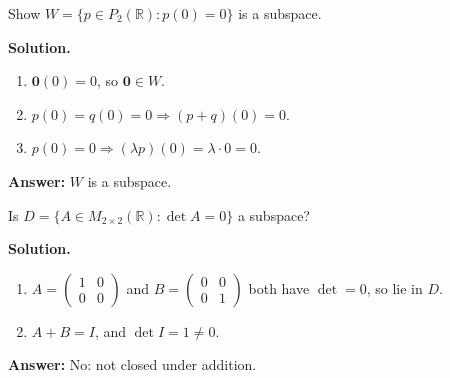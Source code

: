 \documentclass[11pt]{article}
\begin{document}
\begin{tcolorbox}[colback=white,colframe=ink!60,title={\bfseries Example 7 \textperiodcentered\ Subspace test}]Show $W=\{p\in P_{2}(\mathbb{R}):p(0)=0\}$ is a subspace.
\par\smallskip
\textbf{Solution.} \begin{enumerate}[leftmargin=1.6em,itemsep=1pt,topsep=2pt,label=\arabic*.]\item $\mathbf 0(0)=0$, so $\mathbf 0\in W$.
\item $p(0)=q(0)=0\Rightarrow(p+q)(0)=0$.
\item $p(0)=0\Rightarrow(\lambda p)(0)=\lambda\cdot0=0$.
\end{enumerate}\textbf{Answer:} $W$ is a subspace.
\end{tcolorbox}
\begin{tcolorbox}[colback=white,colframe=ink!60,title={\bfseries Example 8 \textperiodcentered\ Non-subspace}]Is $D=\{A\in M_{2\times2}(\mathbb{R}):\det A=0\}$ a subspace?
\par\smallskip
\textbf{Solution.} \begin{enumerate}[leftmargin=1.6em,itemsep=1pt,topsep=2pt,label=\arabic*.]\item $A=\begin{pmatrix}1&0\\0&0\end{pmatrix}$ and $B=\begin{pmatrix}0&0\\0&1\end{pmatrix}$ both have $\det=0$, so lie in $D$.
\item $A+B=I$, and $\det I=1\neq0$.
\end{enumerate}\textbf{Answer:} No: not closed under addition.
\end{tcolorbox}
\newpage
\end{document}
